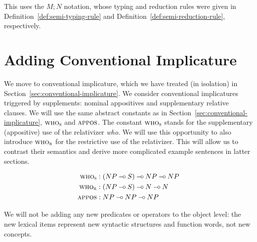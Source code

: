This uses the $M; N$ notation, whose typing and reduction rules were given
in Definition~\ref{def:semi-typing-rule} and
Definition~\ref{def:semi-reduction-rule}, respectively.


\section{Adding Conventional Implicature}
\label{sec:adding-conventional-implicature}

We move to conventional implicature, which we have treated (in isolation)
in Section~\ref{sec:conventional-implicature}. We consider conventional
implicatures triggered by supplements: nominal appositives and
supplementary relative clauses. We will use the same abstract constants as
in Section~\ref{sec:conventional-implicature}, $\textsc{who}_{\textsc{s}}$ and
$\textsc{appos}$. The constant $\textsc{who}_{\textsc{s}}$ stands for the
supplementary (appositive) use of the relativizer \emph{who}. We will use
this opportunity to also introduce $\textsc{who}_{\textsc{r}}$ for the
restrictive use of the relativizer. This will allow us to contrast their
semantics and derive more complicated example sentences in latter sections.

\begin{align*}
  \textsc{who}_{\textsc{s}} &: (NP \mathbin{{-}\mkern-3.5mu{\circ}} S) \mathbin{{-}\mkern-3.5mu{\circ}} NP \mathbin{{-}\mkern-3.5mu{\circ}} NP \\
  \textsc{who}_{\textsc{r}} &: (NP \mathbin{{-}\mkern-3.5mu{\circ}} S) \mathbin{{-}\mkern-3.5mu{\circ}} N \mathbin{{-}\mkern-3.5mu{\circ}} N \\
  \textsc{appos} &: NP \mathbin{{-}\mkern-3.5mu{\circ}} NP \mathbin{{-}\mkern-3.5mu{\circ}} NP
\end{align*}

We will not be adding any new predicates or operators to the object level:
the new lexical items represent new syntactic structures and function
words, not new concepts.

